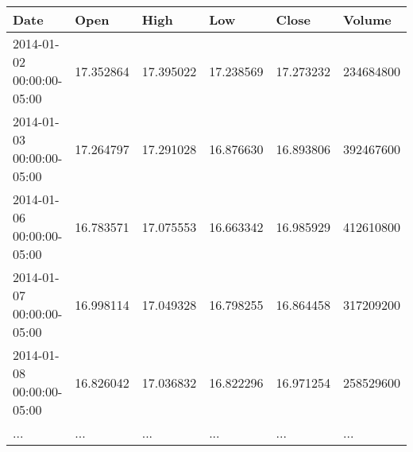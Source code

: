 \begin{tabular}{llllll}
\toprule
Date & Open & High & Low & Close & Volume \\
\midrule
2014-01-02 00:00:00-05:00 & 17.352864 & 17.395022 & 17.238569 & 17.273232 & 234684800 \\
2014-01-03 00:00:00-05:00 & 17.264797 & 17.291028 & 16.876630 & 16.893806 & 392467600 \\
2014-01-06 00:00:00-05:00 & 16.783571 & 17.075553 & 16.663342 & 16.985929 & 412610800 \\
2014-01-07 00:00:00-05:00 & 16.998114 & 17.049328 & 16.798255 & 16.864458 & 317209200 \\
2014-01-08 00:00:00-05:00 & 16.826042 & 17.036832 & 16.822296 & 16.971254 & 258529600 \\
... & ... & ... & ... & ... & ... \\
\bottomrule
\end{tabular}
